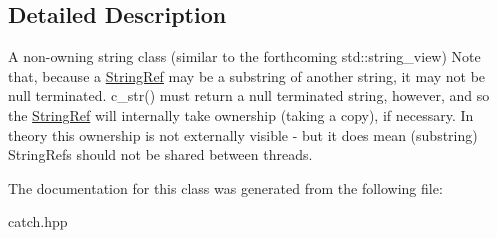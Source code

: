 \subsection{Detailed Description}
A non-\/owning string class (similar to the forthcoming std\+::string\+\_\+view) Note that, because a \hyperlink{classCatch_1_1StringRef}{String\+Ref} may be a substring of another string, it may not be null terminated. c\+\_\+str() must return a null terminated string, however, and so the \hyperlink{classCatch_1_1StringRef}{String\+Ref} will internally take ownership (taking a copy), if necessary. In theory this ownership is not externally visible -\/ but it does mean (substring) String\+Refs should not be shared between threads. 

The documentation for this class was generated from the following file\+:\begin{DoxyCompactItemize}
\item 
catch.\+hpp\end{DoxyCompactItemize}
